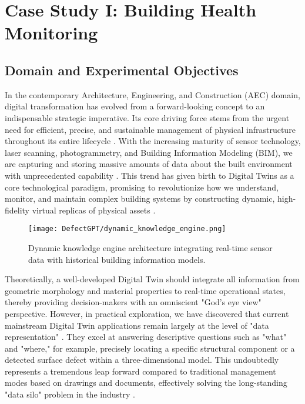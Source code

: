 
\chapter{Case Study I: Building Health Monitoring} \label{chp:building}

\section{Domain and Experimental Objectives}

In the contemporary Architecture, Engineering, and Construction (AEC) domain, digital transformation has evolved from a forward-looking concept to an indispensable strategic imperative. Its core driving force stems from the urgent need for efficient, precise, and sustainable management of physical infrastructure throughout its entire lifecycle \cite{boje2020towards, lu2020digital}. With the increasing maturity of sensor technology, laser scanning, photogrammetry, and Building Information Modeling (BIM), we are capturing and storing massive amounts of data about the built environment with unprecedented capability \cite{tang2019retrieving, li2024single}. This trend has given birth to Digital Twins as a core technological paradigm, promising to revolutionize how we understand, monitor, and maintain complex building systems by constructing dynamic, high-fidelity virtual replicas of physical assets \cite{tao2018digital}.

\begin{figure}[htbp]
\centering
\texttt{[image: DefectGPT/dynamic\_knowledge\_engine.png]}
\caption{Dynamic knowledge engine architecture integrating real-time sensor data with historical building information models.}
\label{fig:dynamic_knowledge_engine}
\end{figure}

Theoretically, a well-developed Digital Twin should integrate all information from geometric morphology and material properties to real-time operational states, thereby providing decision-makers with an omniscient "God's eye view" perspective. However, in practical exploration, we have discovered that current mainstream Digital Twin applications remain largely at the level of "data representation" \cite{negri2017review}. They excel at answering descriptive questions such as "what" and "where," for example, precisely locating a specific structural component or a detected surface defect within a three-dimensional model. This undoubtedly represents a tremendous leap forward compared to traditional management modes based on drawings and documents, effectively solving the long-standing "data silo" problem in the industry \cite{bruno2018historic}.


